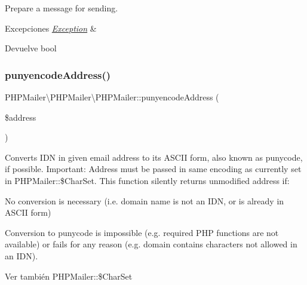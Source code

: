 Prepare a message for sending.


\begin{DoxyExceptions}{Excepciones}
{\em \hyperlink{classPHPMailer_1_1PHPMailer_1_1Exception}{Exception}} & \\
\hline
\end{DoxyExceptions}
\begin{DoxyReturn}{Devuelve}
bool 
\end{DoxyReturn}
\mbox{\label{classPHPMailer_1_1PHPMailer_1_1PHPMailer_a3e8126f823b4c64bdf2b8c614cd22374}} 
\subsubsection{\texorpdfstring{punyencode\+Address()}{punyencodeAddress()}}
{\footnotesize\ttfamily P\+H\+P\+Mailer\textbackslash{}\+P\+H\+P\+Mailer\textbackslash{}\+P\+H\+P\+Mailer\+::punyencode\+Address (\begin{DoxyParamCaption}\item[{}]{\$address }\end{DoxyParamCaption})}

Converts I\+DN in given email address to its A\+S\+C\+II form, also known as punycode, if possible. Important\+: Address must be passed in same encoding as currently set in P\+H\+P\+Mailer\+::\$\+Char\+Set. This function silently returns unmodified address if\+:
\begin{DoxyItemize}
\item No conversion is necessary (i.\+e. domain name is not an I\+DN, or is already in A\+S\+C\+II form)
\item Conversion to punycode is impossible (e.\+g. required P\+HP functions are not available) or fails for any reason (e.\+g. domain contains characters not allowed in an I\+DN).
\end{DoxyItemize}

\begin{DoxySeeAlso}{Ver también}
P\+H\+P\+Mailer\+::\$\+Char\+Set
\end{DoxySeeAlso}

